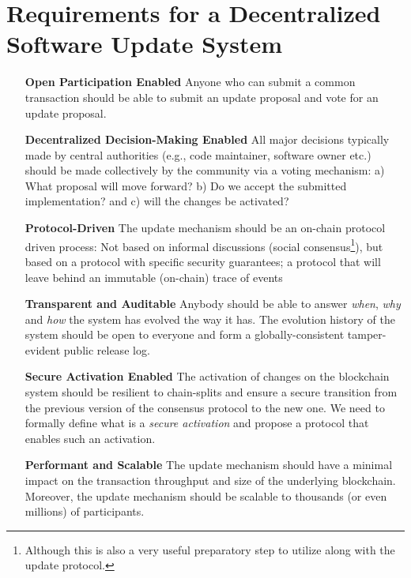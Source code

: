 \section{Requirements for a Decentralized Software Update 
System}\label{sec:requirements}

\begin{itemize}
	\item[\textbf{Open Participation Enabled}] Anyone who can submit a common
	transaction should be able to submit an update proposal and vote for an
	update proposal.
	
	\item[\textbf{Decentralized Decision-Making Enabled}]  All major decisions
	typically made by central authorities (e.g., code maintainer, software
	owner etc.)
	should
	be made
	collectively by the community via a voting mechanism: a) What proposal will
	move forward? b) Do we accept the submitted implementation? and c)
	will the changes be activated?
	
	\item[\textbf{Protocol-Driven}] The update mechanism should be an on-chain
	protocol driven process: Not
	based on informal discussions (social consensus\footnote{Although this is
		also a very useful preparatory step to utilize along with the update
		protocol.}), but based on a protocol
	with specific security guarantees; a protocol that will leave behind an
	immutable (on-chain) trace of events
	
	\item[\textbf{Transparent and Auditable}] Anybody should be able to answer
	\emph{when}, \emph{why} and \emph{how} the system has evolved the way it
	has. The evolution history of the system should be open to everyone and
	form a globally-consistent tamper-evident public release log.
	
	\item[\textbf{Secure Activation Enabled}] The activation of changes on the 
	blockchain system should be resilient to chain-splits and ensure a secure 
	transition from the previous version of the consensus protocol to the new 
	one. We need to formally define what is a \emph{secure
		activation} and propose a protocol that enables such an activation.
	
	\item[\textbf{Performant and Scalable}] The update mechanism should have a 
	minimal impact on the transaction throughput and size of the underlying
	blockchain. Moreover, the update mechanism should be scalable to thousands
	(or even
	millions) of participants.
	

\end{itemize}
